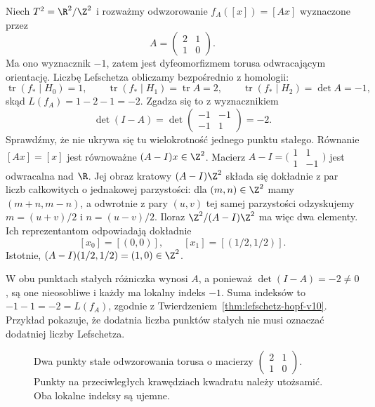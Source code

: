 \begin{przyklad}
\label{prz:lefschetz-torus-dwa-indeksy}
Niech $T^2=\R^2/\Z^2$ i rozważmy
odwzorowanie $f_A([x])=[Ax]$ wyznaczone przez
\[
 A=\begin{pmatrix}2&1\\1&0\end{pmatrix}.
\]
Ma ono wyznacznik $-1$, zatem jest dyfeomorfizmem
torusa odwracającym orientację. Liczbę Lefschetza
obliczamy bezpośrednio z homologii:
\[
 \operatorname{tr}(f_\ast\mid H_0)=1,\qquad
 \operatorname{tr}(f_\ast\mid H_1)=\operatorname{tr}A=2,
 \qquad
 \operatorname{tr}(f_\ast\mid H_2)=\det A=-1,
\]
skąd $L(f_A)=1-2-1=-2$.
Zgadza się to z wyznacznikiem
\[
 \det(I-A)
 =\det\begin{pmatrix}-1&-1\\-1&1\end{pmatrix}=-2.
\]
Sprawdźmy, że nie ukrywa się tu wielokrotność
jednego punktu stałego. Równanie $[Ax]=[x]$
jest równoważne $(A-I)x\in\Z^2$.
Macierz
$A-I=\bigl(\begin{smallmatrix}1&1\\1&-1\end{smallmatrix}\bigr)$
jest odwracalna nad $\R$. Jej obraz kratowy
$(A-I)\Z^2$ składa się dokładnie z par
liczb całkowitych o jednakowej parzystości:
dla $(m,n)\in\Z^2$ mamy
$(m+n,m-n)$, a odwrotnie z pary $(u,v)$
tej samej parzystości odzyskujemy
$m=(u+v)/2$ i $n=(u-v)/2$.
Iloraz $\Z^2/(A-I)\Z^2$ ma więc dwa elementy.
Ich reprezentantom odpowiadają dokładnie
\[
 [x_0]=[(0,0)],\qquad
 [x_1]=[(1/2,1/2)].
\]
Istotnie,
$(A-I)(1/2,1/2)=(1,0)\in\Z^2$.

W obu punktach stałych różniczka wynosi $A$,
a ponieważ $\det(I-A)=-2\ne0$, są one
nieosobliwe i każdy ma lokalny indeks $-1$.
Suma indeksów to $-1-1=-2=L(f_A)$,
zgodnie z Twierdzeniem~\ref{thm:lefschetz-hopf-v10}.
Przykład pokazuje, że dodatnia liczba punktów stałych
nie musi oznaczać dodatniej liczby Lefschetza.
\end{przyklad}

\begin{figure}[!htbp]
\centering
{}
\caption{Dwa punkty stałe odwzorowania torusa
o macierzy $\left(\begin{smallmatrix}2&1\\1&0\end{smallmatrix}\right)$.
Punkty na przeciwległych krawędziach kwadratu
należy utożsamić. Oba lokalne indeksy są ujemne.}
\label{fig:lefschetz-torus-dwa-indeksy}
\end{figure}

